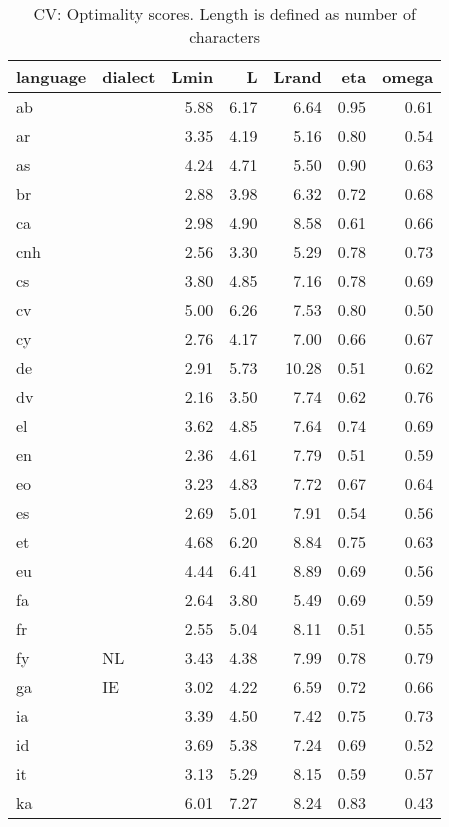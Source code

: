 \begin{table}[H]
\centering
\caption{CV: Optimality scores. Length is defined as number of characters} 
\label{tab:opt_scores_cv_n_chars}
\begin{tabular}{llrrrrr}
  \hline
language & dialect & Lmin & L & Lrand & eta & omega \\ 
  \hline
ab &  & 5.88 & 6.17 & 6.64 & 0.95 & 0.61 \\ 
  ar &  & 3.35 & 4.19 & 5.16 & 0.80 & 0.54 \\ 
  as &  & 4.24 & 4.71 & 5.50 & 0.90 & 0.63 \\ 
  br &  & 2.88 & 3.98 & 6.32 & 0.72 & 0.68 \\ 
  ca &  & 2.98 & 4.90 & 8.58 & 0.61 & 0.66 \\ 
  cnh &  & 2.56 & 3.30 & 5.29 & 0.78 & 0.73 \\ 
  cs &  & 3.80 & 4.85 & 7.16 & 0.78 & 0.69 \\ 
  cv &  & 5.00 & 6.26 & 7.53 & 0.80 & 0.50 \\ 
  cy &  & 2.76 & 4.17 & 7.00 & 0.66 & 0.67 \\ 
  de &  & 2.91 & 5.73 & 10.28 & 0.51 & 0.62 \\ 
  dv &  & 2.16 & 3.50 & 7.74 & 0.62 & 0.76 \\ 
  el &  & 3.62 & 4.85 & 7.64 & 0.74 & 0.69 \\ 
  en &  & 2.36 & 4.61 & 7.79 & 0.51 & 0.59 \\ 
  eo &  & 3.23 & 4.83 & 7.72 & 0.67 & 0.64 \\ 
  es &  & 2.69 & 5.01 & 7.91 & 0.54 & 0.56 \\ 
  et &  & 4.68 & 6.20 & 8.84 & 0.75 & 0.63 \\ 
  eu &  & 4.44 & 6.41 & 8.89 & 0.69 & 0.56 \\ 
  fa &  & 2.64 & 3.80 & 5.49 & 0.69 & 0.59 \\ 
  fr &  & 2.55 & 5.04 & 8.11 & 0.51 & 0.55 \\ 
  fy & NL & 3.43 & 4.38 & 7.99 & 0.78 & 0.79 \\ 
  ga & IE & 3.02 & 4.22 & 6.59 & 0.72 & 0.66 \\ 
  ia &  & 3.39 & 4.50 & 7.42 & 0.75 & 0.73 \\ 
  id &  & 3.69 & 5.38 & 7.24 & 0.69 & 0.52 \\ 
  it &  & 3.13 & 5.29 & 8.15 & 0.59 & 0.57 \\ 
  ka &  & 6.01 & 7.27 & 8.24 & 0.83 & 0.43 \\ 

\end{tabular}
\end{table}
